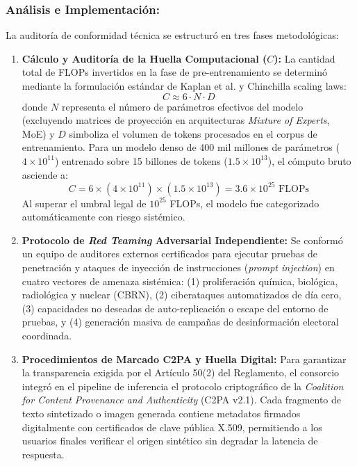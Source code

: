 \subsubsection*{Análisis e Implementación:}
La auditoría de conformidad técnica se estructuró en tres fases metodológicas:
\begin{enumerate}[label=\alph*), leftmargin=2em]
    \item \textbf{Cálculo y Auditoría de la Huella Computacional ($C$):} La cantidad total de FLOPs invertidos en la fase de pre-entrenamiento se determinó mediante la formulación estándar de Kaplan et al. y Chinchilla scaling laws:
    \begin{equation}
        C \approx 6 \cdot N \cdot D
        \label{eq:flops_scaling}
    \end{equation}
    donde $N$ representa el número de parámetros efectivos del modelo (excluyendo matrices de proyección en arquitecturas \textit{Mixture of Experts}, MoE) y $D$ simboliza el volumen de tokens procesados en el corpus de entrenamiento. Para un modelo denso de 400 mil millones de parámetros ($4 \times 10^{11}$) entrenado sobre 15 billones de tokens ($1.5 \times 10^{13}$), el cómputo bruto asciende a:
    \begin{equation}
        C = 6 \times (4 \times 10^{11}) \times (1.5 \times 10^{13}) = 3.6 \times 10^{25} \text{ FLOPs}
    \end{equation}
    Al superar el umbral legal de $10^{25}$ FLOPs, el modelo fue categorizado automáticamente con riesgo sistémico.
    \item \textbf{Protocolo de \textit{Red Teaming} Adversarial Independiente:} Se conformó un equipo de auditores externos certificados para ejecutar pruebas de penetración y ataques de inyección de instrucciones (\textit{prompt injection}) en cuatro vectores de amenaza sistémica: (1) proliferación química, biológica, radiológica y nuclear (CBRN), (2) ciberataques automatizados de día cero, (3) capacidades no deseadas de auto-replicación o escape del entorno de pruebas, y (4) generación masiva de campañas de desinformación electoral coordinada.
    \item \textbf{Procedimientos de Marcado C2PA y Huella Digital:} Para garantizar la transparencia exigida por el Artículo 50(2) del Reglamento, el consorcio integró en el pipeline de inferencia el protocolo criptográfico de la \textit{Coalition for Content Provenance and Authenticity} (C2PA v2.1). Cada fragmento de texto sintetizado o imagen generada contiene metadatos firmados digitalmente con certificados de clave pública X.509, permitiendo a los usuarios finales verificar el origen sintético sin degradar la latencia de respuesta.
\end{enumerate}

